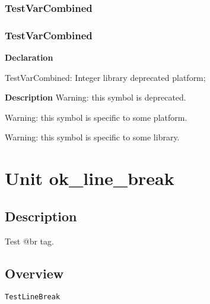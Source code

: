 \documentclass{report}
\newif\ifpdf
\begin{document}
\subsection*{\large{\textbf{TestVarCombined}}\normalsize\hspace{1ex}\hrulefill}
\else
\subsection*{TestVarCombined}
\fi
\label{ok_hint_directives-TestVarCombined}
\begin{list}{}{
\setlength{\itemindent}{0cm}
\setlength{\listparindent}{0cm}
\setlength{\leftmargin}{\evensidemargin}
\addtolength{\leftmargin}{\tmplength}
\settowidth{\labelsep}{X}
\addtolength{\leftmargin}{\labelsep}
\setlength{\labelwidth}{\tmplength}
}
\item[\textbf{Declaration}\hfill]
\ifpdf
\begin{flushleft}
\fi
\begin{ttfamily}
TestVarCombined: Integer library deprecated platform;\end{ttfamily}

\ifpdf
\end{flushleft}
\fi

\par
\item[\textbf{Description}]
Warning: this symbol is deprecated.

Warning: this symbol is specific to some platform.

Warning: this symbol is specific to some library.

 

\end{list}
\chapter{Unit ok{\_}line{\_}break}
\label{ok_line_break}
\section{Description}
Test @br tag.
\section{Overview}
\begin{description}
\item[\texttt{TestLineBreak}]
\end{description}
\end{document}
